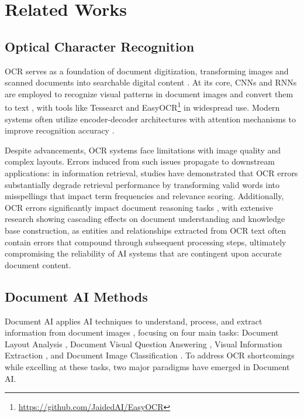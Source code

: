 


\section{Related Works}

\subsection{Optical Character Recognition}
OCR serves as a foundation of document digitization, transforming images and scanned documents into searchable digital content \cite{article_OCRfoundation}. At its core, CNNs and RNNs are employed to recognize visual patterns in document images and convert them to text \cite{RNN_OCR_CHEN, vinyals2015show, qiang2016memorymattersconvolutionalrecurrent, 6126402, 6460871}, with tools like Tessearct \cite{4376991} and EasyOCR\footnote{\url{https://github.com/JaidedAI/EasyOCR}} in widespread use. Modern systems often utilize encoder-decoder architectures with attention mechanisms to improve recognition accuracy \cite{kim2022ocrfreedocumentunderstandingtransformer}. 

Despite advancements, OCR systems face limitations with image quality and complex layouts. Errors induced from such issues propagate to downstream applications: in information retrieval, studies \cite{4624283, 10.1007/s00799-023-00345-6, 10.1007/978-3-030-45442-5_13, zhang2025ocrhindersragevaluating} have demonstrated that OCR errors substantially degrade retrieval performance by transforming valid words into misspellings that impact term frequencies and relevance scoring. Additionally, OCR errors significantly impact document reasoning tasks \cite{gupte2021lightscameraactionframework, artidigh20, in_depth_analysis_of_OCR}, with extensive research showing cascading effects on document understanding and knowledge base construction, as entities and relationships extracted from OCR text often contain errors that compound through subsequent processing steps, ultimately compromising the reliability of AI systems that are contingent upon accurate document content.


\subsection{Document AI Methods}
Document AI applies AI techniques to understand, process, and extract information from document images \cite{cui2021documentaibenchmarksmodels}, focusing on four main tasks: Document Layout Analysis \cite{zhong2019publaynetlargestdatasetdocument, li2020docbankbenchmarkdatasetdocument}, Document Visual Question Answering \cite{mathew2021docvqa, VisualMRC2021, chen2021websrcdatasetwebbasedstructural}, Visual Information Extraction \cite{8977955, wang2021robustvisualinformationextraction, park2019cord}, and Document Image Classification \cite{harley2015evaluationdeepconvolutionalnets, 19694}. To address OCR shortcomings while excelling at these tasks, two major paradigms have emerged in Document AI.


